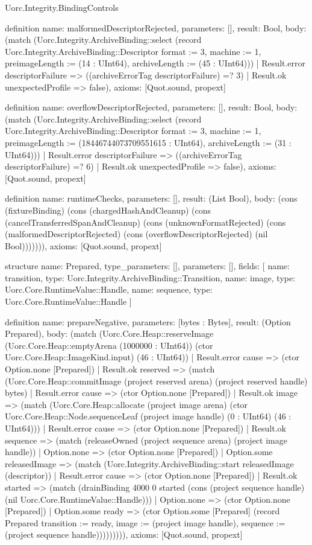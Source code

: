 \begin{lexlean}{Uorc.Integrity.BindingControls}
\begin{semanticmodule}
definition{
  name: malformedDescriptorRejected,
  parameters: [],
  result: Bool,
  body: (match (Uorc.Integrity.ArchiveBinding::select (record Uorc.Integrity.ArchiveBinding::Descriptor {format := 3, machine := 1, preimageLength := (14 : UInt64), archiveLength := (45 : UInt64)}))
    | Result.error descriptorFailure => ((archiveErrorTag descriptorFailure) =? 3)
    | Result.ok unexpectedProfile => false),
  axioms: [Quot.sound, propext]
}

definition{
  name: overflowDescriptorRejected,
  parameters: [],
  result: Bool,
  body: (match (Uorc.Integrity.ArchiveBinding::select (record Uorc.Integrity.ArchiveBinding::Descriptor {format := 3, machine := 1, preimageLength := (18446744073709551615 : UInt64), archiveLength := (31 : UInt64)}))
    | Result.error descriptorFailure => ((archiveErrorTag descriptorFailure) =? 6)
    | Result.ok unexpectedProfile => false),
  axioms: [Quot.sound, propext]
}

definition{
  name: runtimeChecks,
  parameters: [],
  result: (List Bool),
  body: (cons (fixtureBinding) (cons (chargedHashAndCleanup) (cons (cancelTransferredSpanAndCleanup) (cons (unknownFormatRejected) (cons (malformedDescriptorRejected) (cons (overflowDescriptorRejected) (nil Bool))))))),
  axioms: [Quot.sound, propext]
}

structure{
  name: Prepared,
  type_parameters: [],
  parameters: [],
  fields: [
    {name: transition, type: Uorc.Integrity.ArchiveBinding::Transition},
    {name: image, type: Uorc.Core.RuntimeValue::Handle},
    {name: sequence, type: Uorc.Core.RuntimeValue::Handle}
  ]
}

definition{
  name: prepareNegative,
  parameters: [bytes : Bytes],
  result: (Option Prepared),
  body: (match (Uorc.Core.Heap::reserveImage (Uorc.Core.Heap::emptyArena (1000000 : UInt64)) (ctor Uorc.Core.Heap::ImageKind.input) (46 : UInt64))
    | Result.error cause => (ctor Option.none [Prepared])
    | Result.ok reserved => (match (Uorc.Core.Heap::commitImage (project reserved arena) (project reserved handle) bytes)
      | Result.error cause => (ctor Option.none [Prepared])
      | Result.ok image => (match (Uorc.Core.Heap::allocate (project image arena) (ctor Uorc.Core.Heap::Node.sequenceLeaf (project image handle) (0 : UInt64) (46 : UInt64)))
        | Result.error cause => (ctor Option.none [Prepared])
        | Result.ok sequence => (match (releaseOwned (project sequence arena) (project image handle))
          | Option.none => (ctor Option.none [Prepared])
          | Option.some releasedImage => (match (Uorc.Integrity.ArchiveBinding::start releasedImage (descriptor))
            | Result.error cause => (ctor Option.none [Prepared])
            | Result.ok started => (match (drainBinding 4000 0 started (cons (project sequence handle) (nil Uorc.Core.RuntimeValue::Handle)))
              | Option.none => (ctor Option.none [Prepared])
              | Option.some ready => (ctor Option.some [Prepared] (record Prepared {transition := ready, image := (project image handle), sequence := (project sequence handle)})))))))),
  axioms: [Quot.sound, propext]
}


\end{semanticmodule}
\end{lexlean}
